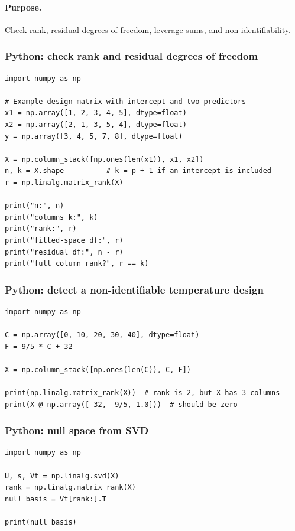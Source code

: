 \paragraph{Purpose.} Check rank, residual degrees of freedom, leverage sums, and non-identifiability.

\subsubsection*{Python: check rank and residual degrees of freedom}

\begin{verbatim}
import numpy as np

# Example design matrix with intercept and two predictors
x1 = np.array([1, 2, 3, 4, 5], dtype=float)
x2 = np.array([2, 1, 3, 5, 4], dtype=float)
y = np.array([3, 4, 5, 7, 8], dtype=float)

X = np.column_stack([np.ones(len(x1)), x1, x2])
n, k = X.shape          # k = p + 1 if an intercept is included
r = np.linalg.matrix_rank(X)

print("n:", n)
print("columns k:", k)
print("rank:", r)
print("fitted-space df:", r)
print("residual df:", n - r)
print("full column rank?", r == k)
\end{verbatim}

\subsubsection*{Python: detect a non-identifiable temperature design}

\begin{verbatim}
import numpy as np

C = np.array([0, 10, 20, 30, 40], dtype=float)
F = 9/5 * C + 32

X = np.column_stack([np.ones(len(C)), C, F])

print(np.linalg.matrix_rank(X))  # rank is 2, but X has 3 columns
print(X @ np.array([-32, -9/5, 1.0]))  # should be zero
\end{verbatim}

\subsubsection*{Python: null space from SVD}

\begin{verbatim}
import numpy as np

U, s, Vt = np.linalg.svd(X)
rank = np.linalg.matrix_rank(X)
null_basis = Vt[rank:].T

print(null_basis)
\end{verbatim}

